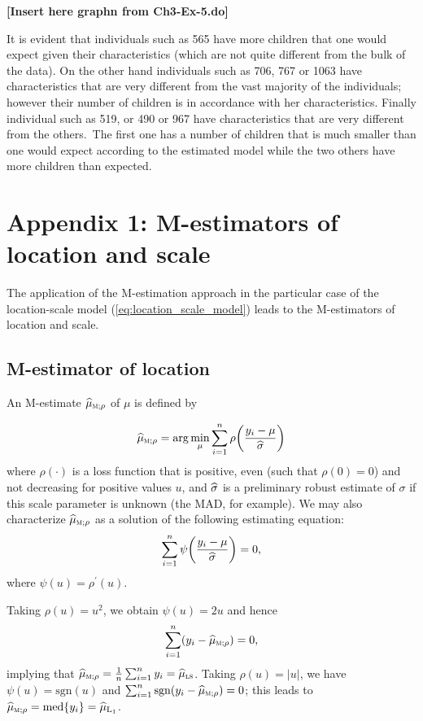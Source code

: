 \begin{stexample}
\textbf{[Insert here  graphn from Ch3-Ex-5.do]}\newline

It is evident that individuals such as 565 have more children that one would
expect given their characteristics (which are not quite\textbf{ }different
from the bulk of the data). On the other hand individuals such as 706, 767 or
1063 have characteristics that are very different from the vast majority of
the individuals; however their number of children is in accordance with her
characteristics. Finally individual such as 519, or 490 or 967 have
characteristics that are very different from the others.\ The first one has a
number of children that is much smaller than one would expect according to the
estimated model while the two others have more children than expected.
\end{stexample}

\section{Appendix 1: M-estimators of location and scale}
\label{sec:robreg:appendix1}

The application of the M-estimation approach in the particular case of the
location-scale model (\ref{eq:location_scale_model}) leads to the M-estimators
of location and scale.

\subsection{M-estimator of location}

An M-estimate $\sthat{\mu}_{\stsc{M};\rho}$ of $\mu$ is defined by%

\[
\sthat{\mu}_{\stsc{M};\rho}=\arg\min_{\mu}\sum_{i=1}^{n}\rho\left(
\frac{y_{i}-\mu}{\sthat{\sigma}}\right)
\]
where $\rho\left(  \cdot\right)  $ is a loss function that is positive, even
(such that $\rho\left(  0\right)  =0$) and not decreasing for positive values
$u$, and $\widehat{\sigma}$ is a preliminary robust estimate of $\sigma$ if
this scale parameter is unknown (the MAD, for example). We may also
characterize $\sthat{\mu}_{\stsc{M};\rho}$ as a solution of the following
estimating equation:
\begin{equation}
\sum_{i=1}^{n}\psi\left(  \frac{y_{i}-\mu}{\sthat{\sigma}}\right)  =0,
\label{eq:M_location_equation}%
\end{equation}
where $\psi(u)=\rho^{\prime}(u)$.

Taking $\rho\left(  u\right)  =u^{2}$, we obtain $\psi\left(  u\right)  =2u$
and hence
\[
\sum_{i=1}^{n}\left(  y_{i}-\sthat{\mu}_{\stsc{M};\rho}\right)  =0,
\]
implying that $\sthat{\mu}_{\stsc{M};\rho}=\frac{1}{n}\sum_{i=1}^{n}%
y_{i}=\sthat{\mu}_{\stsc{LS}}$. Taking $\rho\left(  u\right)  =\left\vert
u\right\vert $, we have $\psi(u)=\mathrm{sgn}(u)$ and $\sum_{i=1}%
^{n}\mathrm{sgn}\left(  y_{i}-\sthat{\mu}_{\stsc{M};\rho}\right)  =0$;
this leads to $\sthat{\mu}_{\stsc{M};\rho}=\mathrm{med}\left\{
y_{i}\right\}  =\sthat{\mu}_{\mathrm{L}_{\mathrm{1}}}$.

